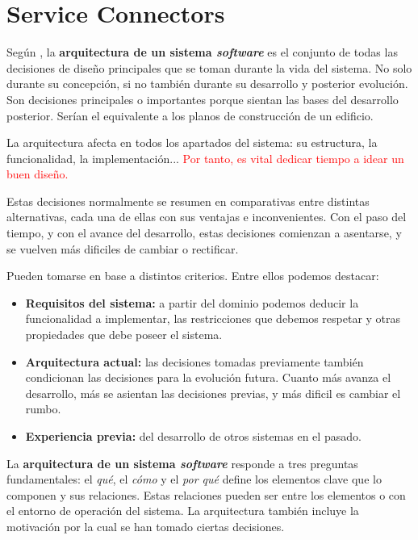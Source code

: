 \chapter{Service Connectors}

Según \cite{taylorSoftwareArchitectureFoundations2009}, la {\bf arquitectura de un sistema \textit{software}} es el conjunto de todas las decisiones de diseño principales que se toman durante la vida del sistema. No solo durante su concepción, si no también durante su desarrollo y posterior evolución. Son decisiones principales o importantes porque sientan las bases del desarrollo posterior. Serían el equivalente a los planos de construcción de un edificio.

La arquitectura afecta en todos los apartados del sistema: su estructura, la funcionalidad, la implementación... \textcolor{red}{Por tanto, es vital dedicar tiempo a idear un buen diseño.}

Estas decisiones normalmente se resumen en comparativas entre distintas alternativas, cada una de ellas con sus ventajas e inconvenientes. Con el paso del tiempo, y con el avance del desarrollo, estas decisiones comienzan a asentarse, y se vuelven más dificiles de cambiar o rectificar.

Pueden tomarse en base a distintos criterios. Entre ellos podemos destacar:

    \begin{itemize}
        \item \textbf{Requisitos del sistema:} a partir del dominio podemos deducir la funcionalidad a implementar, las restricciones que debemos respetar y otras propiedades que debe poseer el sistema.
        \item \textbf{Arquitectura actual:} las decisiones tomadas previamente también condicionan las decisiones para la evolución futura. Cuanto más avanza el desarrollo, más se asientan las decisiones previas, y más dificil es cambiar el rumbo.
        \item \textbf{Experiencia previa:} del desarrollo de otros sistemas en el pasado.
    \end{itemize} 

La {\bf arquitectura de un sistema \textit{software}} responde a tres preguntas fundamentales: el \textit{qué}, el \textit{cómo} y el \textit{por qué} define los elementos clave que lo componen y sus relaciones. Estas relaciones pueden ser entre los elementos o con el entorno de operación del sistema. La arquitectura también incluye la motivación por la cual se han tomado ciertas decisiones. \cite{perryFoundationsStudySoftware1992}

